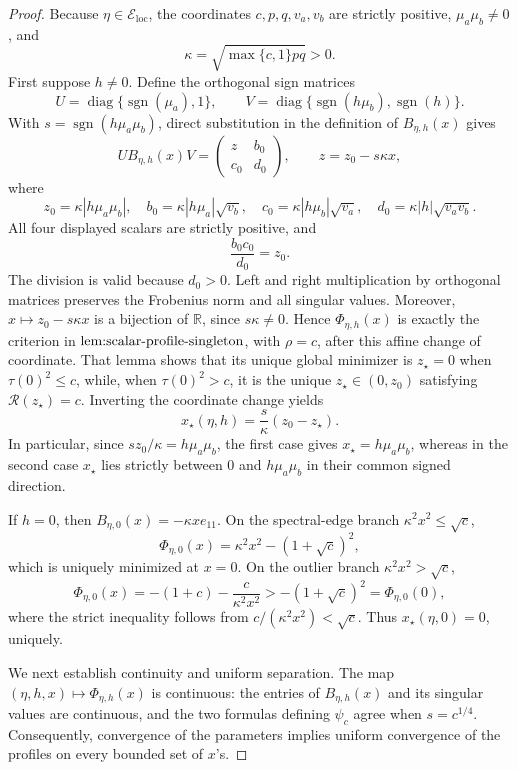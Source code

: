 \documentclass{article}
\begin{document}
\begin{proof}
Because \(\eta\in\mathcal E_{\mathrm{loc}}\), the coordinates \(c,p,q,v_a,v_b\) are strictly positive, \(\mu_a\mu_b\neq0\), and
\[
 \kappa=\sqrt{\max\{c,1\}pq}>0.
\]
First suppose \(h\neq0\).  Define the orthogonal sign matrices
\[
 U=\operatorname{diag}\{\operatorname{sgn}(\mu_a),1\},
 \qquad
 V=\operatorname{diag}\{\operatorname{sgn}(h\mu_b),\operatorname{sgn}(h)\}.
\]
With \(s=\operatorname{sgn}(h\mu_a\mu_b)\), direct substitution in the definition of \(B_{\eta,h}(x)\) gives
\[
 UB_{\eta,h}(x)V
 =\begin{pmatrix}z&b_0\\c_0&d_0\end{pmatrix},
 \qquad z=z_0-s\kappa x,
\]
where
\[
 z_0=\kappa|h\mu_a\mu_b|,
 \quad b_0=\kappa|h\mu_a|\sqrt{v_b},
 \quad c_0=\kappa|h\mu_b|\sqrt{v_a},
 \quad d_0=\kappa|h|\sqrt{v_av_b}.
\]
All four displayed scalars are strictly positive, and
\[
 \frac{b_0c_0}{d_0}=z_0.
\]
The division is valid because \(d_0>0\).  Left and right multiplication by orthogonal matrices preserves the Frobenius norm and all singular values.  Moreover, \(x\mapsto z_0-s\kappa x\) is a bijection of \(\mathbb R\), since \(s\kappa\neq0\).  Hence \(\Phi_{\eta,h}(x)\) is exactly the criterion in \(\textnormal{lem:scalar-profile-singleton}\), with \(\rho=c\), after this affine change of coordinate.  That lemma shows that its unique global minimizer is \(z_\star=0\) when \(\tau(0)^2\leq c\), while, when \(\tau(0)^2>c\), it is the unique \(z_\star\in(0,z_0)\) satisfying \(\mathcal R(z_\star)=c\).  Inverting the coordinate change yields
\[
 x_\star(\eta,h)=\frac{s}{\kappa}(z_0-z_\star).
\]
In particular, since \(sz_0/\kappa=h\mu_a\mu_b\), the first case gives \(x_\star=h\mu_a\mu_b\), whereas in the second case \(x_\star\) lies strictly between \(0\) and \(h\mu_a\mu_b\) in their common signed direction.

If \(h=0\), then \(B_{\eta,0}(x)=-\kappa xe_{11}\).  On the spectral-edge branch \(\kappa^2x^2\leq\sqrt c\),
\[
 \Phi_{\eta,0}(x)=\kappa^2x^2-(1+\sqrt c)^2,
\]
which is uniquely minimized at \(x=0\).  On the outlier branch \(\kappa^2x^2>\sqrt c\),
\[
 \Phi_{\eta,0}(x)=-(1+c)-\frac{c}{\kappa^2x^2}
 >-(1+\sqrt c)^2=\Phi_{\eta,0}(0),
\]
where the strict inequality follows from \(c/(\kappa^2x^2)<\sqrt c\).  Thus \(x_\star(\eta,0)=0\), uniquely.

We next establish continuity and uniform separation.  The map \((\eta,h,x)\mapsto\Phi_{\eta,h}(x)\) is continuous: the entries of \(B_{\eta,h}(x)\) and its singular values are continuous, and the two formulas defining \(\psi_c\) agree when \(s=c^{1/4}\).  Consequently, convergence of the parameters implies uniform convergence of the profiles on every bounded set of \(x\)'s.


\end{proof}
\end{document}

